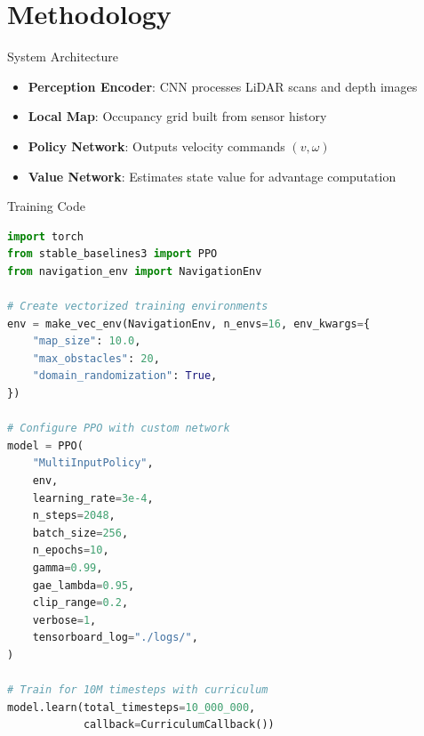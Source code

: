 \documentclass[aspectratio=169]{beamer}
\begin{document}
\section{Methodology}

\begin{frame}{System Architecture}
  \begin{center}
  \end{center}

  \vspace{0.3cm}
  \begin{itemize}
    \item \textbf{Perception Encoder}: CNN processes LiDAR scans and depth images
    \item \textbf{Local Map}: Occupancy grid built from sensor history
    \item \textbf{Policy Network}: Outputs velocity commands $(v, \omega)$
    \item \textbf{Value Network}: Estimates state value for advantage computation
  \end{itemize}
\end{frame}

\begin{frame}[fragile]{Training Code}
  \begin{lstlisting}[language=Python]
import torch
from stable_baselines3 import PPO
from navigation_env import NavigationEnv

# Create vectorized training environments
env = make_vec_env(NavigationEnv, n_envs=16, env_kwargs={
    "map_size": 10.0,
    "max_obstacles": 20,
    "domain_randomization": True,
})

# Configure PPO with custom network
model = PPO(
    "MultiInputPolicy",
    env,
    learning_rate=3e-4,
    n_steps=2048,
    batch_size=256,
    n_epochs=10,
    gamma=0.99,
    gae_lambda=0.95,
    clip_range=0.2,
    verbose=1,
    tensorboard_log="./logs/",
)

# Train for 10M timesteps with curriculum
model.learn(total_timesteps=10_000_000,
            callback=CurriculumCallback())
  \end{lstlisting}
\end{frame}
\end{document}

